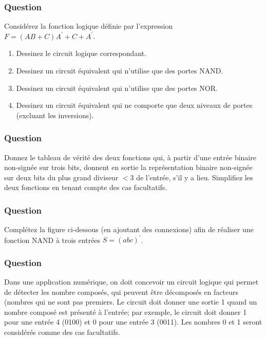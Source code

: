 \documentclass[11pt]{article}
\begin{document}
\subsubsection*{Question}
\label{sec:org994ff7c}
Considérez la fonction logique définie par l'expression \(F = (AB + C)
      A^{\prime} + C + A^{\prime}\).

\begin{enumerate}
\item Dessinez le circuit logique correspondant.

\item Dessinez un circuit équivalent qui n'utilise que des portes
NAND.

\item Dessinez un circuit équivalent qui n'utilise que des portes
NOR.

\item Dessinez un circuit équivalent qui ne comporte que deux niveaux de
portes (excluant les inversions).
\end{enumerate}

\subsubsection*{Question}
\label{sec:orgac4e84d}
Donnez le tableau  de vérité des deux fonctions qui, à partir d'une
  entrée binaire non-signée sur trois bits, donnent en sortie la
  représentation binaire non-signée sur deux bits du plus grand diviseur
  \(< 3\) de l'entrée, s'il y a lieu. Simplifiez les deux fonctions en
  tenant compte des cas facultatifs.

\subsubsection*{Question}
\label{sec:org337f0fc}
Complétez la figure ci-dessous (en ajoutant des connexions) afin de
  réaliser une  fonction NAND à trois entrées \(S = (a b c)^\prime\).
  \begin{center}

\end{center}

\subsubsection*{Question}
\label{sec:org6efb02e}
Dans une application numérique, on doit concevoir un circuit logique
qui permet de détecter les nombre composés, qui peuvent être
décomposés en facteurs (nombres qui ne sont pas premiers. Le circuit
doit donner une sortie 1 quand un nombre composé est présenté à
l'entrée; par exemple, le circuit doit donner 1 pour une entrée 4
(0100) et 0 pour une entrée 3 (0011). Les nombres 0 et 1 seront
considérés comme des cas facultatifs.
\end{document}
